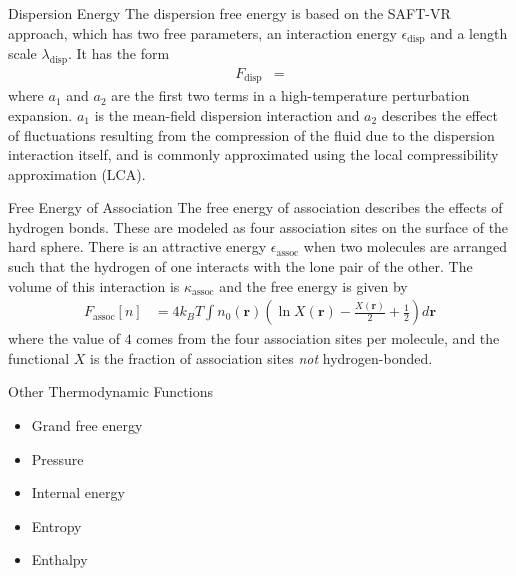 \documentclass{beamer}
\begin{document}
\begin{frame}[fragile]{Dispersion Energy}
The dispersion free energy is based on the SAFT-VR
approach, which has two free
parameters, an interaction energy $\epsilon_\text{disp}$ and a
length scale $\lambda_\text{disp}$. It has the form
\begin{align}
  F_\text{disp} &= 
\end{align}
where $a_1$ and $a_2$ are the first two terms in a high-temperature
perturbation expansion.  $a_1$ is the mean-field dispersion
interaction and $a_2$ describes the
effect of fluctuations resulting from the compression of the fluid due
to the dispersion interaction itself, and is commonly approximated
using the local compressibility approximation (LCA).
\end{frame}

\begin{frame}[fragile]{Free Energy of Association}
The free energy of association describes the effects of hydrogen bonds. These are modeled as
four association sites on the surface of the
hard sphere. There is an attractive energy
$\epsilon_\text{assoc}$ when two molecules are arranged such that
the hydrogen of one interacts with the lone pair of the other.  The
volume of this interaction is $\kappa_\text{assoc}$ and the free energy is given by
\begin{align}
  F_\text{assoc}[n] &= 4 k_BT \int n_0(\textbf{r})
  \left(\ln X(\textbf{r}) - \frac{X(\textbf{r})}{2} + \frac12\right) d\textbf{r}
\end{align}
where the value of $4$ comes from the four association sites per
molecule, and the functional $X$ is the fraction of association sites
\emph{not} hydrogen-bonded. 
\end{frame}

\begin{frame}[fragile]{Other Thermodynamic Functions}
\begin{itemize}
 \item Grand free energy
 \item Pressure
 \item Internal energy
 \item Entropy
 \item Enthalpy
\end{itemize}
\end{frame}
\end{document}

